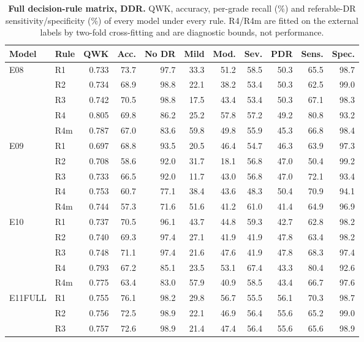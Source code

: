 \begin{table}[h]
\caption{\textbf{Full decision-rule matrix, DDR.} QWK, accuracy, per-grade recall (\%) and referable-DR sensitivity/specificity (\%) of every model under every rule. R4/R4m are fitted on the external labels by two-fold cross-fitting and are diagnostic bounds, not performance.}\label{tab:s5}
\centering\scriptsize
\begin{tabular}{@{}llrrrrrrrrr@{}}
\toprule
Model & Rule & QWK & Acc. & No DR & Mild & Mod. & Sev. & PDR & Sens. & Spec. \\
\midrule
E08 & R1 & 0.733 & 73.7 & 97.7 & 33.3 & 51.2 & 58.5 & 50.3 & 65.5 & 98.7 \\
 & R2 & 0.734 & 68.9 & 98.8 & 22.1 & 38.2 & 53.4 & 50.3 & 62.5 & 99.0 \\
 & R3 & 0.742 & 70.5 & 98.8 & 17.5 & 43.4 & 53.4 & 50.3 & 67.1 & 98.3 \\
 & R4 & 0.805 & 69.8 & 86.2 & 25.2 & 57.8 & 57.2 & 49.2 & 80.8 & 93.2 \\
 & R4m & 0.787 & 67.0 & 83.6 & 59.8 & 49.8 & 55.9 & 45.3 & 66.8 & 98.4 \\
\addlinespace
E09 & R1 & 0.697 & 68.8 & 93.5 & 20.5 & 46.4 & 54.7 & 46.3 & 63.9 & 97.3 \\
 & R2 & 0.708 & 58.6 & 92.0 & 31.7 & 18.1 & 56.8 & 47.0 & 50.4 & 99.2 \\
 & R3 & 0.733 & 66.5 & 92.0 & 11.7 & 43.0 & 56.8 & 47.0 & 72.1 & 93.4 \\
 & R4 & 0.753 & 60.7 & 77.1 & 38.4 & 43.6 & 48.3 & 50.4 & 70.9 & 94.1 \\
 & R4m & 0.744 & 57.3 & 71.6 & 51.6 & 41.2 & 61.0 & 41.4 & 64.9 & 96.9 \\
\addlinespace
E10 & R1 & 0.737 & 70.5 & 96.1 & 43.7 & 44.8 & 59.3 & 42.7 & 62.8 & 98.2 \\
 & R2 & 0.740 & 69.3 & 97.4 & 27.1 & 41.9 & 41.9 & 47.8 & 63.4 & 98.2 \\
 & R3 & 0.748 & 71.1 & 97.4 & 21.6 & 47.6 & 41.9 & 47.8 & 68.3 & 97.4 \\
 & R4 & 0.793 & 67.2 & 85.1 & 23.5 & 53.1 & 67.4 & 43.3 & 80.4 & 92.6 \\
 & R4m & 0.775 & 63.4 & 83.0 & 57.9 & 40.9 & 58.5 & 43.4 & 66.7 & 97.6 \\
\addlinespace
E11FULL & R1 & 0.755 & 76.1 & 98.2 & 29.8 & 56.7 & 55.5 & 56.1 & 70.3 & 98.7 \\
 & R2 & 0.756 & 72.5 & 98.9 & 22.1 & 46.9 & 56.4 & 55.6 & 65.2 & 99.0 \\
 & R3 & 0.757 & 72.6 & 98.9 & 21.4 & 47.4 & 56.4 & 55.6 & 65.6 & 98.9 \\

\end{tabular}
\end{table}
